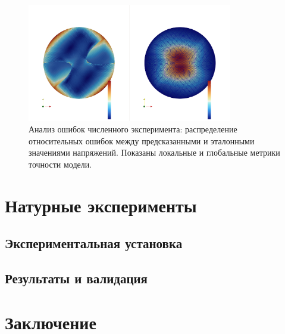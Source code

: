 \begin{figure}[htbp]
\centering
\includegraphics[width=0.8\textwidth]{img/bx_inf_err.png}
\caption{Анализ ошибок численного эксперимента: распределение относительных ошибок между предсказанными и эталонными значениями напряжений. Показаны локальные и глобальные метрики точности модели.}
\label{fig:numerical_errors}
\end{figure}


\section{Натурные эксперименты}
\subsection{Экспериментальная установка}

\subsection{Результаты и валидация}

\section{Заключение}



